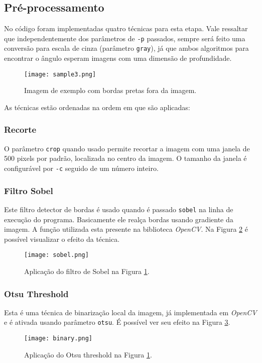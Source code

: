 \documentclass[10pt,twocolumn,letterpaper]{article}
\begin{document}
\subsection{Pré-processamento}
No código foram implementadas quatro técnicas para esta etapa. Vale ressaltar que independentemente dos parâmetros de \texttt{-p} passados, sempre será feito uma conversão para escala de cinza (parâmetro \texttt{gray}), já que ambos algoritmos para encontrar o ângulo esperam imagens com uma dimensão de profundidade.\\
\begin{figure}
    \centering
    \texttt{[image: sample3.png]}
    \caption{Imagem de exemplo com bordas pretas fora da imagem.\label{fig:sample3}}
\end{figure}
As técnicas estão ordenadas na ordem em que são aplicadas:
\subsubsection*{Recorte}
O parâmetro \texttt{crop} quando usado permite recortar a imagem com uma janela de 500 pixels por padrão, localizada no centro da imagem. O tamanho da janela é configurável por \texttt{-c} seguido de um número inteiro.
\subsubsection*{Filtro Sobel}
Este filtro detector de bordas é usado quando é passado \texttt{sobel} na linha de execução do programa. Basicamente ele realça bordas usando gradiente da imagem. A função utilizada esta presente na biblioteca \emph{OpenCV}. Na Figura \ref{fig:sobel} é possível visualizar o efeito da técnica.
\begin{figure}
    \centering
    \texttt{[image: sobel.png]}
    \caption{Aplicação do filtro de Sobel na Figura \ref{fig:sample3}.\label{fig:sobel}}
\end{figure}
\subsubsection*{Otsu Threshold}
Esta é uma técnica de binarização local da imagem, já implementada em \emph{OpenCV} e é ativada usando parâmetro \texttt{otsu}. É possível ver seu efeito na Figura \ref{fig:otsu}.
\begin{figure}
    \centering
    \texttt{[image: binary.png]}
    \caption{Aplicação do Otsu threshold na Figura \ref{fig:sample3}.\label{fig:otsu}}
\end{figure}
\end{document}
